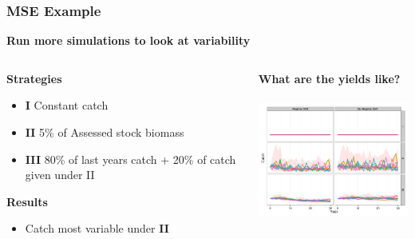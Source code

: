 \begin{frame}\frametitle{MSE Example}
\smallskip\textbf{Run more simulations to look at variability}\smallskip\\
\begin{columns}[t] 
\begin{column}[T]{4cm} %
     \smallskip\textbf{Strategies}\smallskip\\
       \Fontviii
       \begin{itemize}
          \item \textbf{I} Constant catch
          \item \textbf{II} 5\% of Assessed stock biomass
          \item \textbf{III} 80\% of last years catch + 20\% of catch given under II
        \end{itemize}
     \smallskip\textbf{Results}\smallskip\\
       \Fontviii
       \begin{itemize}
          \item Catch most variable under \textbf{II}
        \end{itemize}
     \end{column}
\begin{column}[T]{6cm}
 \smallskip\textbf{What are the yields like?}\smallskip\\ 
  \includegraphics[height=48mm,width=64mm]{mp6.png}
\end{column}
     \end{columns}    
\end{frame}

